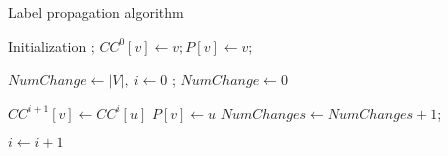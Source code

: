 \begin{algorithm}[!t]
\small
\caption{Label propagation algorithm}
\label{alg:SV_ALG}
\begin{algorithmic}[1]

	\State Initialization ;
		\State	$CC^{0}[v]\gets v; P[v]\gets v$;
	\EndFor

	\State $NumChange\gets |V|,\ i\gets 0$
	;
		\State $NumChange \gets 0$

				\State $CC^{i+1}[v]\gets CC^{i}[u]$
				\State $P[v]\gets u$
				\State $NumChanges \gets NumChanges+1$;
				\EndIf

			\EndFor
		\EndFor
		\State $i \gets i+1$
	\EndWhile 


\end{algorithmic}
\end{algorithm}
%